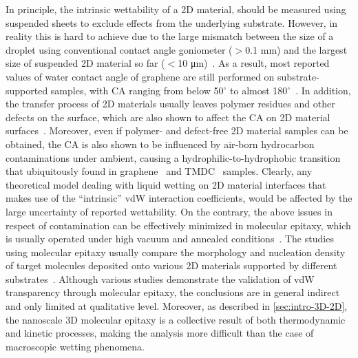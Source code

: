 %
In principle, the intrinsic wettability of a 2D material, should be
measured using suspended sheets to exclude effects from the underlying
substrate.
%
However, in reality this is hard to achieve due to the large
mismatch between the size of a droplet using conventional contact
angle goniometer ($>$0.1 mm) and the largest size of suspended 2D
material so far ($<$10 μm)~\autocite{Zhang_2017_transfer_suspended}.
%
As a result, most reported values of water contact angle of graphene
are still performed on substrate-supported samples, with CA ranging
from below 50$^{\circ}$ to almost
180$^{\circ}$~\autocite{Kozbial_study_2014_gr_wetting,Raj_2013_wetting_rev,Wang_2009_wettability}.
%
In addition, the transfer process of 2D materials usually leaves
polymer residues and other defects on the surface, which are also
shown to affect the CA on 2D material surfaces~\autocite{Kozbial_2015_wetting_mos2}.
%
Moreover, even if polymer- and defect-free 2D material samples can be
obtained, the CA is also shown to be influenced by air-born
hydrocarbon contaminations under ambient, causing a
hydrophilic-to-hydrophobic transition that ubiquitously found in
graphene~\autocite{li_2013_airborne} and TMDC~\autocite{Chow_2015_wetting_WS2}
samples.
%
Clearly, any theoretical model dealing with liquid wetting on 2D
material interfaces that makes use of the ``intrinsic'' vdW
interaction coefficients, would be affected by the
large uncertainty of reported wettability.
%
On the contrary, the above issues in respect of contamination can be
effectively minimized in molecular epitaxy, which is usually operated
under high vacuum and annealed conditions~\autocite{Koma_1985_vdWE}.
%
%
The studies using molecular epitaxy usually compare the morphology and
nucleation density of target molecules deposited onto various 2D
materials supported by different substrates~\autocite{Kratzer_2016_6P_gr_trans,Nguyen_2015_pent_gr_wett}.
%
Although various studies demonstrate the validation of vdW
transparency through molecular epitaxy, the conclusions are in general
indirect and only limited at qualitative level.
%
Moreover, as described in \autoref{sec:intro-3D-2D}, the nanoscale 3D
molecular epitaxy is a collective result of both thermodynamic and
kinetic processes, making the analysis more difficult than the case of
macroscopic wetting phenomena.


